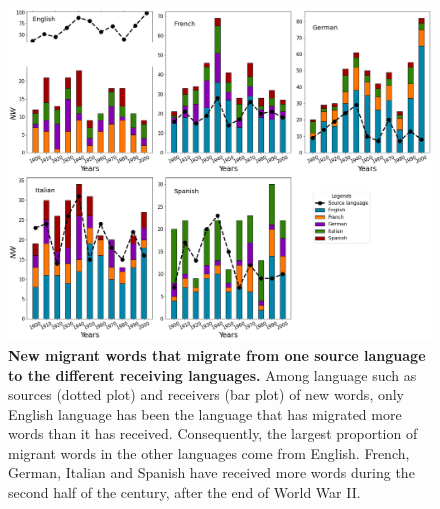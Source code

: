 \documentclass[10pt,letterpaper]{article} %
\begin{document}
	\begin{figure}[!h] %
		\begin{adjustwidth}{-1.2in}{0in}
			\includegraphics[scale=.35]{NW_A.png}
			\caption{{\bf New migrant words that migrate from one source language to the different receiving languages.} Among language such as sources (dotted plot) and receivers (bar plot) of new words, only English language has been the language that has migrated more words than it has received. Consequently, the largest proportion of migrant words in the other languages ​​come from English. French, German, Italian and Spanish have received more words during the second half of the century, after the end of World War II.	
			}
			\label{fig.NMW_A}
		\end{adjustwidth}
	\end{figure} %
\end{document}
